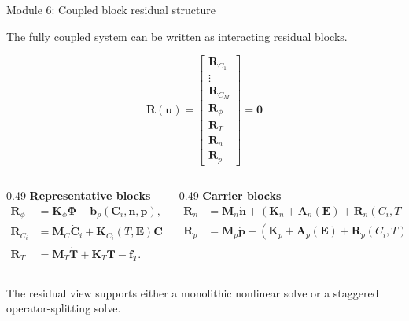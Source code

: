 \documentclass[aspectratio=169,9pt]{beamer}
\newcommand{\E}{\bm{E}}
\newcommand{\vect}[1]{\bm{#1}}
\newcommand{\mat}[1]{\mathbf{#1}}
\begin{document}
\begin{frame}{Module 6: Coupled block residual structure}
\footnotesize
\vspace{-3mm}
\begin{bluebox}
\centering
The fully coupled system can be written as interacting residual blocks.
\end{bluebox}

\vspace{1mm}
\begin{equation*}
\boxed{
\vect{R}(\vect{u})=
\begin{bmatrix}
\vect{R}_{C_1}\\[-1mm]
\vdots\\[-1mm]
\vect{R}_{C_M}\\[-1mm]
\vect{R}_{\phi}\\[-1mm]
\vect{R}_{T}\\[-1mm]
\vect{R}_{n}\\[-1mm]
\vect{R}_{p}
\end{bmatrix}
=\vect{0}}
\end{equation*}

\vspace{1mm}
\begin{columns}[T,totalwidth=\textwidth]
\begin{column}{0.49\textwidth}
\textbf{Representative blocks}
\begin{align*}
\vect{R}_{\phi}&=\mat{K}_{\phi}\vect{\Phi}-\vect{b}_{\rho}(\vect{C}_i,\vect{n},\vect{p}),\\
\vect{R}_{C_i}&=\mat{M}_C\dot{\vect{C}}_i+\mat{K}_{C_i}(T,\E)\vect{C}_i-\vect{g}_{C_i},\\
\vect{R}_{T}&=\mat{M}_T\dot{\vect{T}}+\mat{K}_T\vect{T}-\vect{f}_T.
\end{align*}
\end{column}
\begin{column}{0.49\textwidth}
\textbf{Carrier blocks}
\begin{align*}
\vect{R}_{n}&=\mat{M}_n\dot{\vect{n}}+\left(\mat{K}_n+\mat{A}_n(\E)+\mat{R}_n(C_i,T)\right)\vect{n}-\vect{g}_n,\\
\vect{R}_{p}&=\mat{M}_p\dot{\vect{p}}+\left(\mat{K}_p+\mat{A}_p(\E)+\mat{R}_p(C_i,T)\right)\vect{p}-\vect{g}_p.
\end{align*}
\end{column}
\end{columns}

\vspace{1mm}
\begin{purplebox}
\centering\scriptsize
The residual view supports either a monolithic nonlinear solve or a staggered operator-splitting solve.
\end{purplebox}
\end{frame}
\end{document}
